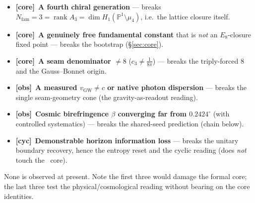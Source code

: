 \documentclass[11pt,a4paper]{article}
\newcommand{\fcore}{{\small\textcolor{tfgreen!50!black}{\textbf{[core]}}}}
\newcommand{\fcyc}{{\small\textcolor{tfgold!75!black}{\textbf{[cyc]}}}}
\newcommand{\fobs}{{\small\textcolor{tfblue!70!black}{\textbf{[obs]}}}}
\newcommand{\cthree}{c_3}
\newcommand{\Nfam}{N_{\mathrm{fam}}}
\begin{document}
\begin{itemize}[leftmargin=1.4em]
\item \fcore\ \textbf{A fourth chiral generation} --- breaks $\Nfam=3=\operatorname{rank}A_3=\dim H_1(\mathbb P^1\setminus\mu_4)$, i.e.\ the lattice closure itself.
\item \fcore\ \textbf{A genuinely free fundamental constant} that is \emph{not} an $E_8$-closure fixed point --- breaks the bootstrap (\S\ref{sec:core}).
\item \fcore\ \textbf{A seam denominator $\neq8$} ($\cthree\neq\tfrac1{8\pi}$) --- breaks the triply-forced $8$ and the Gauss--Bonnet origin.
\item \fobs\ \textbf{A measured $v_{\mathrm{GW}}\neq c$ or native photon dispersion} --- breaks the single seam-geometry cone (the gravity-as-readout reading).
\item \fobs\ \textbf{Cosmic birefringence $\beta$ converging far from $0.2424^\circ$} (with controlled systematics) --- breaks the shared-seed prediction (chain below).
\item \fcyc\ \textbf{Demonstrable horizon information loss} --- breaks the unitary boundary recovery, hence the entropy reset and the cyclic reading (does \emph{not} touch the \mE\ core).
\end{itemize}
None is observed at present. Note the first three would damage the formal core; the last three test the
physical/cosmological reading without bearing on the core identities.
\end{document}
